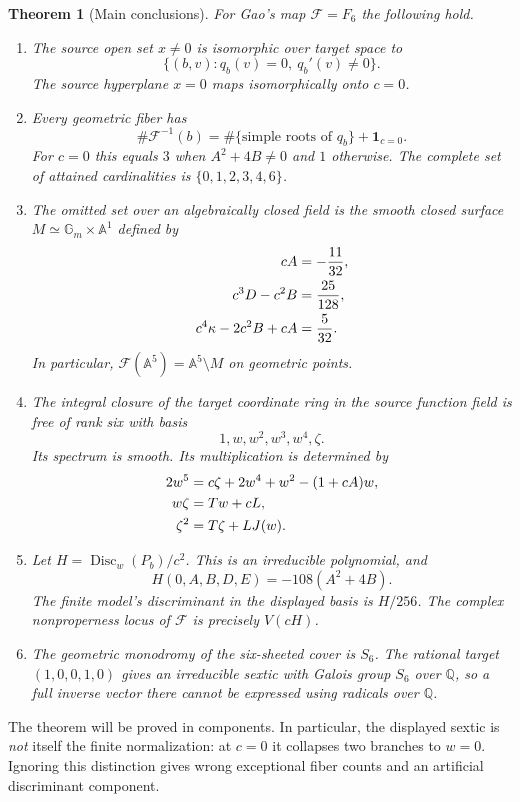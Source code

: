 \documentclass[11pt,a4paper]{article}
\newtheorem{theorem}{Theorem}[section]
\theoremstyle{definition}
\newcommand{\A}{\mathbb A}
\newcommand{\Q}{\mathbb Q}
\newcommand{\Gm}{\mathbb G_m}
\newcommand{\Disc}{\operatorname{Disc}}
\newcommand{\F}{\mathcal F}
\newcommand{\kk}{\kappa}
\begin{document}
\begin{theorem}[Main conclusions]\label{f6:thm:main}
For Gao's map $\F=F_6$ the following hold.
\begin{enumerate}[label=\textup{(\roman*)}]
\item The source open set $x\ne0$ is isomorphic over target space to
\[
 \{(b,v):q_b(v)=0,\ q_b'(v)\ne0\}.
\]
The source hyperplane $x=0$ maps isomorphically onto $c=0$.
\item Every geometric fiber has
\[
 \#\F^{-1}(b)=\#\{\text{simple roots of }q_b\}+\mathbf1_{c=0}.
\]
For $c=0$ this equals $3$ when $A^2+4B\ne0$ and $1$ otherwise.
The complete set of attained cardinalities is $\{0,1,2,3,4,6\}$.
\item The omitted set over an algebraically closed field is the smooth
closed surface $M\simeq\Gm\times\A^1$ defined by
\begin{align}
 cA&=-\frac{11}{32},\notag\\
 c^3D-c^2B&=\frac{25}{128},\label{f6:eq:M}\\
 c^4\kk-2c^2B+cA&=\frac{5}{32}.\notag
\end{align}
In particular, $\F(\A^5)=\A^5\setminus M$ on geometric points.
\item The integral closure of the target coordinate ring in the source
function field is free of rank six with basis
\[
 1,w,w^2,w^3,w^4,\zeta.
\]
Its spectrum is smooth. Its multiplication is determined by
\begin{align}
 2w^5&=c\zeta+2w^4+w^2-(1+cA)w,\notag\\
 w\zeta&=Tw+cL,\label{f6:eq:rules}\\
 \zeta^2&=T\zeta+LJ(w).\notag
\end{align}
\item Let $H=\Disc_w(P_b)/c^2$. This is an irreducible polynomial, and
\[
 H(0,A,B,D,E)=-108(A^2+4B).
\]
The finite model's discriminant in the displayed basis is $H/256$.
The complex nonproperness locus of $\F$ is precisely $V(cH)$.
\item The geometric monodromy of the six-sheeted cover is $S_6$.
The rational target $(1,0,0,1,0)$ gives an irreducible sextic with Galois
group $S_6$ over $\Q$, so a full inverse vector there cannot be expressed
using radicals over $\Q$.
\end{enumerate}
\end{theorem}

The theorem will be proved in components. In particular, the displayed
sextic is \emph{not} itself the finite normalization: at $c=0$ it collapses
two branches to $w=0$. Ignoring this distinction gives wrong exceptional
fiber counts and an artificial discriminant component.
\end{document}
